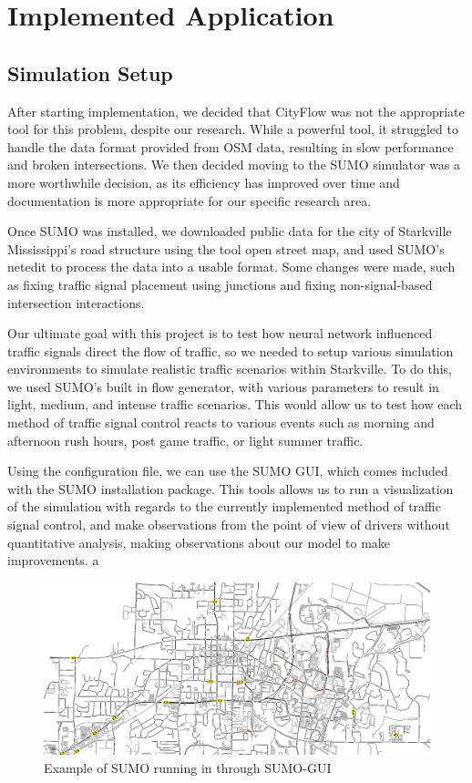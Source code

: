 \documentclass[conference]{IEEEtran}
\begin{document}
\section{Implemented Application}

\subsection{Simulation Setup}

After starting implementation, we decided that CityFlow was not the appropriate tool for this problem, despite our research. While a powerful tool, it struggled to handle the data format provided from OSM data, resulting in slow performance and broken intersections. We then decided moving to the SUMO simulator was a more worthwhile decision, as its efficiency has improved over time and documentation is more appropriate for our specific research area. 

Once SUMO was installed, we downloaded public data for the city of Starkville Mississippi's road structure using the tool open street map, and used SUMO's netedit to process the data into a usable format. Some changes were made, such as fixing traffic signal placement using junctions and fixing non-signal-based intersection interactions. 

Our ultimate goal with this project is to test how neural network influenced traffic signals direct the flow of traffic, so we needed to setup various simulation environments to simulate realistic traffic scenarios within Starkville. To do this, we used SUMO's built in flow generator, with various parameters to result in light, medium, and intense traffic scenarios. This would allow us to test how each method of traffic signal control reacts to various events such as morning and afternoon rush hours, post game traffic, or light summer traffic. 

Using the configuration file, we can use the SUMO GUI, which comes included with the SUMO installation package. This tools allows us to run a visualization of the simulation with regards to the currently implemented method of traffic signal control, and make observations from the point of view of drivers without quantitative analysis, making observations about our model to make improvements. a

\begin{figure}[H]
    \centering
    \includegraphics[width=0.9\linewidth]{SUMO_RUNNING.png}
    \caption{Example of SUMO running in through SUMO-GUI}
\end{figure}
\end{document}
